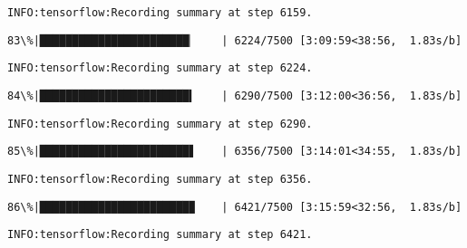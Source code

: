 \documentclass[11pt]{article}
\begin{document}
    \begin{Verbatim}[commandchars=\\\{\}]
INFO:tensorflow:Recording summary at step 6159.

    \end{Verbatim}

    \begin{Verbatim}[commandchars=\\\{\}]
 83\%|███████████████████████▏    | 6224/7500 [3:09:59<38:56,  1.83s/b]
    \end{Verbatim}

    \begin{Verbatim}[commandchars=\\\{\}]
INFO:tensorflow:Recording summary at step 6224.

    \end{Verbatim}

    \begin{Verbatim}[commandchars=\\\{\}]
 84\%|███████████████████████▍    | 6290/7500 [3:12:00<36:56,  1.83s/b]
    \end{Verbatim}

    \begin{Verbatim}[commandchars=\\\{\}]
INFO:tensorflow:Recording summary at step 6290.

    \end{Verbatim}

    \begin{Verbatim}[commandchars=\\\{\}]
 85\%|███████████████████████▋    | 6356/7500 [3:14:01<34:55,  1.83s/b]
    \end{Verbatim}

    \begin{Verbatim}[commandchars=\\\{\}]
INFO:tensorflow:Recording summary at step 6356.

    \end{Verbatim}

    \begin{Verbatim}[commandchars=\\\{\}]
 86\%|███████████████████████▉    | 6421/7500 [3:15:59<32:56,  1.83s/b]
    \end{Verbatim}

    \begin{Verbatim}[commandchars=\\\{\}]
INFO:tensorflow:Recording summary at step 6421.

    \end{Verbatim}
\end{document}
